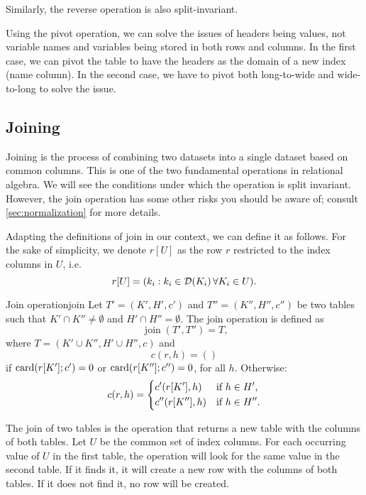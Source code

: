 Similarly, the reverse operation is also split-invariant.

Using the pivot operation, we can solve the issues of headers being values, not variable
names and variables being stored in both rows and columns.  In the first case, we can pivot
the table to have the headers as the domain of a new index (name column).  In the second
case, we have to pivot both long-to-wide and wide-to-long to solve the issue.

\subsection{Joining}

Joining is the process of combining two datasets into a single dataset based on common
columns.  This is one of the two fundamental operations in relational algebra. We will see
the conditions under which the operation is split invariant. However, the join operation
has some other risks you should be aware of; consult \cref{sec:normalization} for more
details.

Adapting the definitions of join in our context, we can define it as follows.
For the sake of simplicity, we denote $r[U]$ as the row $r$ restricted to the index
columns in $U$, i.e.
\begin{equation*}
  r[U] = (k_i : k_i \in \domainof{K_i} \forall K_i \in U)\text{.}
\end{equation*}

\begin{defbox}{Join operation}{join}
  Let $T' = (K', H', c')$ and $T'' = (K'', H'', c'')$ be two tables such that $K'
  \cap K'' \neq \emptyset$ and $H' \cap H'' = \emptyset$.  The join operation is
  defined as \[
    \operatorname{join}(T', T'') = T\text{,}
  \] where $T = (K' \cup K'', H' \cup H'', c)$ and \[
    c(r, h) = ()
  \] if $\rowcard[{r[K']; c'}] = 0$ or $\rowcard[{r[K'']; c''}] = 0$, for all $h$.
  Otherwise: \[
    c(r, h) = \begin{dcases}
      c'(r[K'], h) & \text{if } h \in H'\text{,} \\
      c''(r[K''], h) & \text{if } h \in H''\text{.}
    \end{dcases}
  \]
\end{defbox}

The join of two tables is the operation that returns a new table with the columns of both
tables.  Let $U$ be the common set of index columns.  For each occurring value of $U$ in
the first table, the operation will look for the same value in the second table.  If it
finds it, it will create a new row with the columns of both tables.  If it does not find
it, no row will be created.

